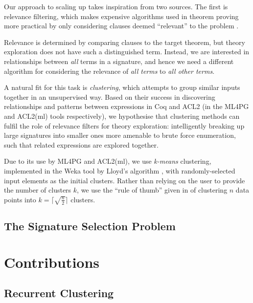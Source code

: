 Our approach to scaling up \qspec{} takes inspiration from two sources. The
first is relevance filtering, which makes expensive algorithms used in theorem
proving more practical by only considering clauses deemed ``relevant'' to the
problem \cite{meng2009lightweight}.

Relevance is determined by comparing clauses to the target theorem, but theory
exploration does not have such a distinguished term. Instead, we are interested
in relationships between \emph{all} terms in a signature, and hence we need a
different algorithm for considering the relevance of \emph{all terms} to
\emph{all other terms}.

A natural fit for this task is \emph{clustering}, which attempts to group
similar inputs together in an unsupervised way. Based on their success in
discovering relationships and patterns between expressions in Coq and ACL2 (in
the ML4PG and ACL2(ml) tools respectively), we hypothesise that clustering
methods can fulfil the role of relevance filters for theory exploration:
intelligently breaking up large signatures into smaller ones more amenable to
brute force enumeration, such that related expressions are explored together.

Due to its use by ML4PG and ACL2(ml), we use \emph{k-means} clustering,
implemented in the Weka tool \cite{Holmes.Donkin.Witten:1994} by Lloyd's
algorithm \cite{lloyd1982least}, with randomly-selected input elements as the
initial clusters. Rather than relying on the user to provide the number of
clusters $k$, we use the ``rule of thumb'' given in
\cite[pp. 365]{mardia1979multivariate} of clustering $n$ data points into
$k = \lceil \sqrt{\frac{n}{2}} \rceil$ clusters.

\subsection{The Signature Selection Problem}
\label{sec:sigselect}


\section{Contributions}
\label{sec:contributions}

\subsection{Recurrent Clustering}
\label{sec:recurrentclustering}


